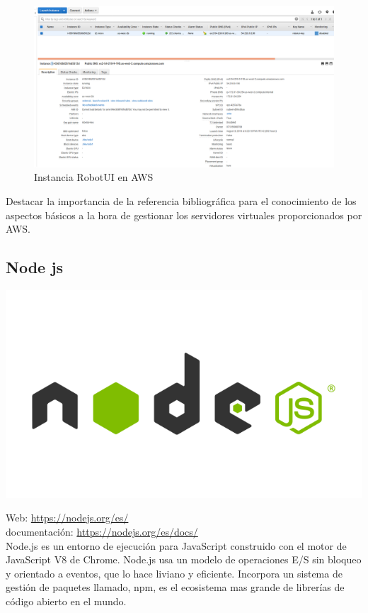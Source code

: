 \begin{figure}
\includegraphics[scale=0.3]{imagenes/aws_instance.png}
\caption{Instancia RobotUI en AWS}
\end{figure}

Destacar la importancia de la referencia bibliográfica \cite{book:awsdummies} para el conocimiento de los aspectos básicos a la hora de gestionar los servidores virtuales proporcionados por AWS.


\subsection{Node js}

\begin{center}
\includegraphics[scale=0.3]{imagenes/nodejs-logo.png}
\end{center}

Web: \url{https://nodejs.org/es/}\\
documentación: \url{https://nodejs.org/es/docs/}\cite{website:4}\\

Node.js es un entorno de ejecución para JavaScript construido con el motor de JavaScript V8 de Chrome. Node.js usa un modelo de operaciones E/S sin bloqueo y orientado a eventos, que lo hace liviano y eficiente. Incorpora un sistema de gestión de paquetes llamado, npm, es el ecosistema mas grande de librerías de código abierto en el mundo.\\

